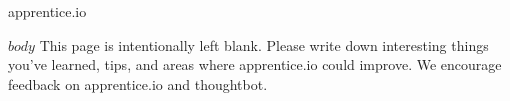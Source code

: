 \documentclass{article}
\begin{document}


  \vspace*{\fill}
    \begin{center}
      {\Huge apprentice.io}
    \end{center}
  \vspace*{\fill}

  \clearpage

  \setcounter{page}{0}


  $body$
  \clearpage
  This page is intentionally left blank. Please write down interesting things
  you've learned, tips, and areas where apprentice.io could improve. We encourage
  feedback on apprentice.io and thoughtbot.
\end{document}
